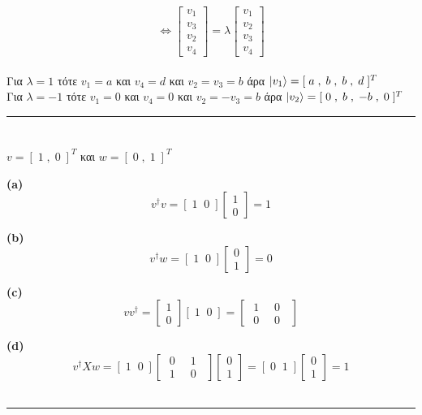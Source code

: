 \documentclass[12pt]{article}
\begin{document}
$$\Leftrightarrow \begin{bmatrix} v_1 \\ v_3\\v_2\\v_4 \end{bmatrix} = \lambda \begin{bmatrix} v_1 \\ v_2\\v_3\\v_4 \end{bmatrix}$$\\
Για $\lambda =1 $ τότε $v_1=a$ και $v_4 =d $  και $v_2 =v_3=b $ άρα $\ket{v_1} = [\;a \;,\; b\;,\;b\;,\;d \;]^T$\\
Για $\lambda =-1 $ τότε $v_1=0$ και $v_4 =0 $ και $v_2 =-v_3=b $ άρα $\ket{v_2} =[ \;0 \;,\; b\;,\;-b\;,\;0 \;]^T$ \\
\rule{\textwidth}{.5pt}

\section*{{}}
{\centering
$v=[\;1 \;,\;0\;]^T$ και $w=[\;0 \;,\;1\;]^T$
}


{\bf { (\textlatin{a})}}$$v^\dag v = [\;1 \;\;0\;]\begin{bmatrix}
    1\\0
\end{bmatrix}=1$$

{\bf { (\textlatin{b})}} $$v^\dag w = [\;1 \;\;0\;]\begin{bmatrix}
    0\\1
\end{bmatrix}=0$$

{\bf { (\textlatin{c)}}} $$vv^\dag  = \begin{bmatrix}
    1\\0
\end{bmatrix}[\;1 \;\;0\;]=\begin{bmatrix}\; 1 \;&\; 0\; \;\\\;0\;&\;0\;\;\end{bmatrix}$$


{\bf { (\textlatin{d)}}} $$v^\dag X w = [\;1 \;\;0\;]\begin{bmatrix}
    \;0\;&\;1\;\;\\\;1\;&\;0\;\;
\end{bmatrix}\begin{bmatrix}
    0\\1
\end{bmatrix}=[\;0 \;\;1\;]\begin{bmatrix}
    0\\1
\end{bmatrix}=1$$\\
\rule{\textwidth}{.5pt}
\end{document}
